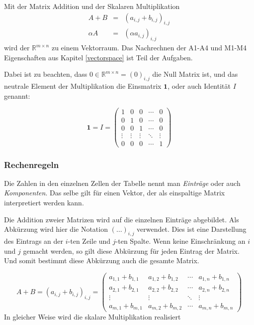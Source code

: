 Mit der Matrix Addition und der Skalaren Multiplikation
\begin{eqnarray*}
A+B &=& (a_{i,j} + b_{i,j})_{i,j} \\
\alpha A &=& (\alpha a_{i,j})_{i,j}
\end{eqnarray*}
wird der $\mathbb{R}^{m\times n}$ zu einem Vektorraum. Das Nachrechnen der A1-A4 und M1-M4 Eigenschaften aus Kapitel \ref{vectorspace} ist Teil der Aufgaben.

Dabei ist zu beachten, dass $0 \in \mathbb{R}^{m\times n} = (0)_{i,j}$ die Null Matrix ist, und das neutrale Element der Multiplikation die Einsmatrix $\mathbf{1}$, oder auch Identität $I$ genannt:

\begin{equation}\label{matrixid}
\mathbf{1} = I =
\begin{pmatrix}
1 & 0 & 0 & \cdots & 0 \\
0 & 1 & 0 & \cdots & 0 \\
0 & 0 & 1 & \cdots & 0 \\
\vdots & \vdots & \vdots & \ddots & \vdots \\
0 & 0 & 0 & \cdots & 1
\end{pmatrix}
\end{equation}

\subsubsection{Rechenregeln}

\begin{definition}
Die Zahlen in den einzelnen Zellen der Tabelle nennt man \emph{Einträge} oder auch \emph{Komponenten}. Das selbe gilt für einen Vektor, der als einspaltige Matrix interpretiert werden kann.
\end{definition}

Die Addition zweier Matrizen wird auf die einzelnen Einträge abgebildet. Als Abkürzung wird hier die Notation $(\dots)_{i,j}$ verwendet. Dies ist eine Darstellung des Eintrags an der $i$-ten Zeile und $j$-ten Spalte. Wenn keine Einschränkung an $i$ und $j$ gemacht werden, so gilt diese Abkürzung für jeden Eintrag der Matrix. Und somit bestimmt diese Abkürzung auch die gesamte Matrix.

\begin{equation*}
A + B = \left( a_{i,j} + b_{i,j} \right)_{i,j} = \begin{pmatrix}
a_{1,1}+b_{1,1} & a_{1,2}+b_{1,2} & \cdots & a_{1,n}+b_{1,n} \\
a_{2,1}+b_{2,1} & a_{2,2}+b_{2,2} & \cdots & a_{2,n}+b_{2,n} \\
\vdots & \vdots & \ddots & \vdots \\
a_{m,1}+b_{m,1} & a_{m,2}+b_{m,2} & \cdots & a_{m,n}+b_{m,n}
\end{pmatrix}
\end{equation*}
In gleicher Weise wird die skalare Multiplikation realisiert

